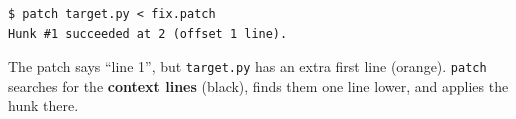 \documentclass[aspectratio=169,10pt,compress]{beamer}
\begin{document}
\begin{frame}[t,fragile]
\begin{center}
\end{center}
\vspace{-0.6em}
\vspace{-0.3em}
\begin{lstlisting}[language={}]
$ patch target.py < fix.patch
Hunk #1 succeeded at 2 (offset 1 line).
\end{lstlisting}
\small The patch says ``line 1'', but \texttt{target.py} has an extra first line (orange).
\texttt{patch} searches for the \textbf{context lines} (black), finds them one line lower,
and applies the hunk there.
\end{frame}
\end{document}
